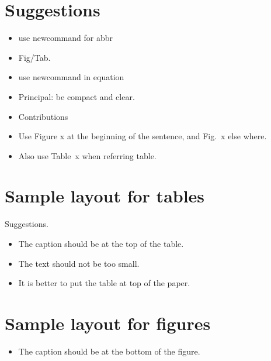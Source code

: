 \documentclass[10pt,twocolumn,letterpaper]{article}
\begin{document}
\section{Suggestions}
\begin{itemize}
    \item use newcommand for abbr
    \item Fig/Tab.
    \item use newcommand in equation
    \item Principal: be compact and clear.
    \item Contributions
    \item Use Figure x at the beginning of the sentence, and Fig.~x else where.
    \item Also use Table~x when referring table.
\end{itemize}

\clearpage
\section{Sample layout for tables}
Suggestions.
\begin{itemize}
    \item The caption should be at the top of the table.
    \item The text should not be too small.
    \item It is better to put the table at top of the paper.
\end{itemize}





 
\clearpage
\section{Sample layout for figures}
\begin{itemize}
    \item The caption should be at the bottom of the figure. 
\end{itemize}
\end{document}
